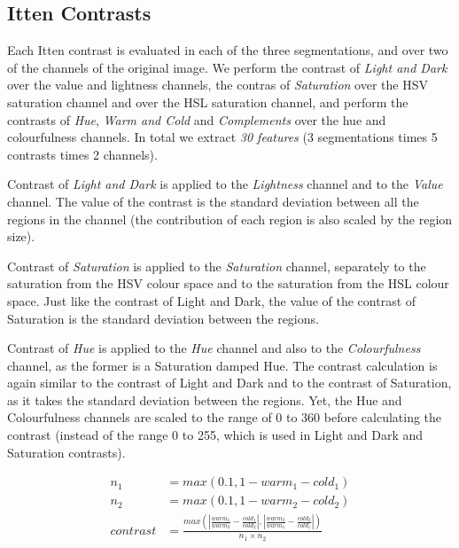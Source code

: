 \documentclass[11pt,a4paper,twoside,openright]{report}
\begin{document}
\subsection{Itten Contrasts}

Each Itten contrast is evaluated in each of the three segmentations, and over
two of the channels of the original image.  We perform the contrast of
\emph{Light and Dark} over the value and lightness channels, the contras of
\emph{Saturation} over the HSV saturation channel and over the HSL saturation
channel, and perform the contrasts of \emph{Hue}, \emph{Warm and Cold} and
\emph{Complements} over the hue and colourfulness channels.  In total we
extract \emph{30 features} (3 segmentations times 5 contrasts times 2
channels).

Contrast of \emph{Light and Dark} is applied to the \emph{Lightness} channel
and to the \emph{Value} channel.  The value of the contrast is the standard
deviation between all the regions in the channel (the contribution of each
region is also scaled by the region size).

Contrast of \emph{Saturation} is applied to the \emph{Saturation} channel,
separately to the saturation from the HSV colour space and to the saturation
from the HSL colour space.  Just like the contrast of Light and Dark, the value
of the contrast of Saturation is the standard deviation between the regions.

Contrast of \emph{Hue} is applied to the \emph{Hue} channel and also to the
\emph{Colourfulness} channel, as the former is a Saturation damped Hue.  The
contrast calculation is again similar to the contrast of Light and Dark and to
the contrast of Saturation, as it takes the standard deviation between the
regions.  Yet, the Hue and Colourfulness channels are scaled to the range of 0
to 360 before calculating the contrast (instead of the range 0 to 255, which is
used in Light and Dark and Saturation contrasts).

\begin{figure}[!htb]
\begin{equation}
\begin{aligned}
n_1       &= max(0.1, 1 - warm_1 - cold_1) \\
n_2       &= max(0.1, 1 - warm_2 - cold_2) \\
contrast  &= \frac{ max\left( \left\lvert \frac{warm_1}{warm_2}
                                        - \frac{cold_1}{cold_2} \right\rvert
                            , \left\lvert \frac{warm_2}{warm_1}
                                        - \frac{cold_2}{cold_1} \right\rvert
                       \right)
                 }{ n_1 \times n_2 }
\label{eq:coldwarm}
\end{aligned}
\end{equation}
\end{figure}
\end{document}

